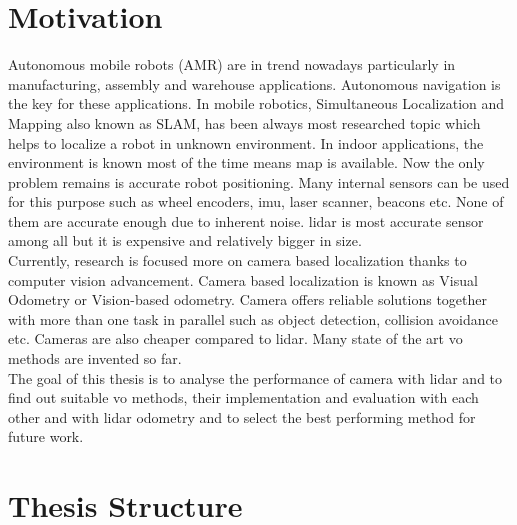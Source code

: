 \section{Motivation}
Autonomous mobile robots (AMR) are in trend nowadays particularly in manufacturing, assembly and warehouse applications. Autonomous navigation is the key for these applications. In mobile robotics, Simultaneous Localization and Mapping also known as SLAM, has been always most researched topic which helps to localize a robot in unknown environment. In indoor applications, the environment is known most of the time means map is available. Now the only problem remains is accurate robot positioning. Many internal sensors can be used for this purpose such as wheel encoders, \acrshort{imu}, laser scanner, beacons etc. None of them are accurate enough due to inherent noise. \acrshort{lidar} is most accurate sensor among all but it is expensive and relatively bigger in size.\\
\newline
Currently, research is focused more on camera based localization thanks to computer vision advancement. Camera based localization is known as Visual Odometry or Vision-based odometry. Camera offers reliable solutions together with more than one task in parallel such as object detection, collision avoidance etc. Cameras are also cheaper compared to \acrshort{lidar}. Many state of the art \acrshort{vo} methods are invented so far.\\
\newline
The goal of this thesis is to analyse the performance of camera with \acrshort{lidar} and to find out suitable \acrshort{vo} methods, their implementation and evaluation with each other and with \acrshort{lidar} odometry and to select the best performing method for future work.

\section{Thesis Structure}

